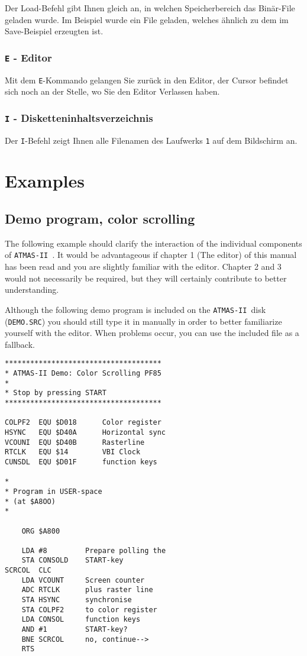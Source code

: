 \documentclass[10pt,a4paper,twoside,final,openright,titlepage]{memoir}
\def\atmas{\texttt{AT\-MAS-II }}
\begin{document}
Der Load-Befehl gibt Ihnen gleich an, in welchen
Speicherbereich das Binär-File geladen wurde. Im
Beispiel wurde ein File geladen, welches ähnlich
zu dem im Save-Beispiel erzeugten ist.

\subsection{\texttt{E} - Editor}

Mit dem \texttt{E}-Kommando gelangen Sie zurück in den Editor,
der Cursor befindet sich noch an der Stelle, wo Sie
den Editor Verlassen haben.

\subsection{\texttt{I} - Disketteninhaltsverzeichnis}

Der \texttt{I}-Befehl zeigt Ihnen alle Filenamen des Laufwerks
\texttt{1} auf dem Bildschirm an.

\chapter{Examples}

\section{Demo program, color scrolling}

The following example should clarify the interaction of the individual components of \atmas.
It would be advantageous if chapter 1 (The editor) of this manual has been read and you are slightly familiar with the editor.
Chapter 2 and 3 would not necessarily be required, but they will certainly contribute to better understanding. 

Although the following demo program is included on the \atmas disk (\texttt{DEMO.SRC})
you should still type it in manually in order to better familiarize yourself with the editor.
When problems occur, you can use the included file as a fallback.

\begin{Verbatim}
*************************************
* ATMAS-II Demo: Color Scrolling PF85
*
* Stop by pressing START
*************************************

COLPF2  EQU $D018      Color register
HSYNC   EQU $D40A      Horizontal sync
VCOUNI  EQU $D40B      Rasterline
RTCLK   EQU $14        VBI Clock
CUNSDL  EQU $D01F      function keys

*
* Program in USER-space
* (at $A8OO)
*

	ORG $A800

	LDA #8         Prepare polling the
	STA CONSOLD    START-key
SCRCOL  CLC
	LDA VCOUNT     Screen counter
	ADC RTCLK      plus raster line
	STA HSYNC      synchronise
	STA COLPF2     to color register
	LDA CONSOL     function keys
	AND #1         START-key?
	BNE SCRCOL     no, continue-->
	RTS
\end{Verbatim}
\end{document}
